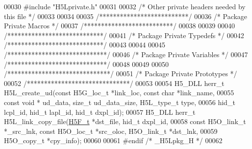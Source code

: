 \begin{DoxyCode}
00030 \textcolor{preprocessor}{#include "H5Lprivate.h"}
00031 
00032 \textcolor{comment}{/* Other private headers needed by this file */}
00033 
00034 
00035 \textcolor{comment}{/**************************/}
00036 \textcolor{comment}{/* Package Private Macros */}
00037 \textcolor{comment}{/**************************/}
00038 
00039 
00040 \textcolor{comment}{/****************************/}
00041 \textcolor{comment}{/* Package Private Typedefs */}
00042 \textcolor{comment}{/****************************/}
00043 
00044 
00045 \textcolor{comment}{/*****************************/}
00046 \textcolor{comment}{/* Package Private Variables */}
00047 \textcolor{comment}{/*****************************/}
00048 
00049 
00050 \textcolor{comment}{/******************************/}
00051 \textcolor{comment}{/* Package Private Prototypes */}
00052 \textcolor{comment}{/******************************/}
00053 
00054 H5\_DLL herr\_t H5L\_create\_ud(\textcolor{keyword}{const} H5G\_loc\_t *link\_loc, \textcolor{keyword}{const} \textcolor{keywordtype}{char} *link\_name,
00055     \textcolor{keyword}{const} \textcolor{keywordtype}{void} * ud\_data, \textcolor{keywordtype}{size\_t} ud\_data\_size, H5L\_type\_t type,
00056     hid\_t lcpl\_id, hid\_t lapl\_id, hid\_t dxpl\_id);
00057 H5\_DLL herr\_t H5L\_link\_copy\_file(\hyperlink{struct_h5_f__t}{H5F\_t} *dst\_file, hid\_t dxpl\_id,
00058     \textcolor{keyword}{const} H5O\_link\_t *\_src\_lnk, \textcolor{keyword}{const} H5O\_loc\_t *src\_oloc, H5O\_link\_t *dst\_lnk,
00059     H5O\_copy\_t *cpy\_info);
00060 
00061 \textcolor{preprocessor}{#endif }\textcolor{comment}{/* \_H5Lpkg\_H */}\textcolor{preprocessor}{}
00062 
\end{DoxyCode}
